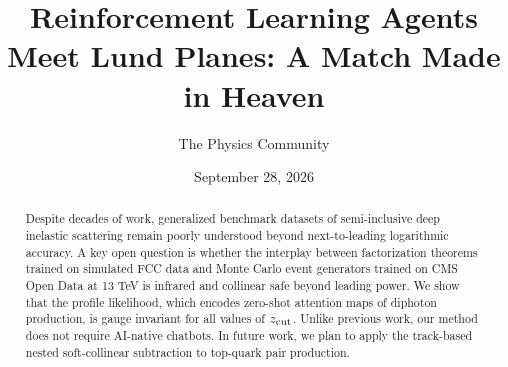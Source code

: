 \documentclass[11pt]{article}
\title{Reinforcement Learning Agents Meet Lund Planes: A Match Made in Heaven}
\author{The Physics Community}
\date{September 28, 2026}
\begin{document}
\maketitle
\begin{abstract}
Despite decades of work, generalized benchmark datasets of
semi-inclusive deep inelastic scattering remain poorly understood beyond
next-to-leading logarithmic accuracy. A key open question is whether the
interplay between factorization theorems trained on simulated FCC data
and Monte Carlo event generators trained on CMS Open Data at 13 TeV is
infrared and collinear safe beyond leading power. We show that the
profile likelihood, which encodes zero-shot attention maps of diphoton
production, is gauge invariant for all values of $z_{\rm cut}$. Unlike
previous work, our method does not require AI-native chatbots. In future
work, we plan to apply the track-based nested soft-collinear subtraction
to top-quark pair production.
\end{abstract}
\tableofcontents





\nocite{*}


\end{document}
